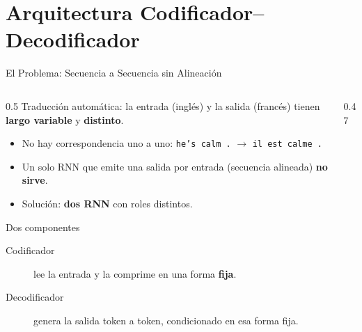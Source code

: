 \documentclass[aspectratio=169, 10pt]{beamer}
\begin{document}
\section{Arquitectura Codificador--Decodificador}

\begin{frame}{El Problema: Secuencia a Secuencia sin Alineaci\'on}

	\begin{columns}[T]
		\begin{column}{0.5\textwidth}
			\small
			Traducci\'on autom\'atica: la entrada (ingl\'es) y la salida (franc\'es) tienen \textbf{largo variable} y \textbf{distinto}.
			\begin{itemize}
				\item No hay correspondencia uno a uno: \texttt{he's calm .} $\to$ \texttt{il est calme .}
				\item Un solo RNN que emite una salida por entrada (secuencia alineada) \textbf{no sirve}.
				\item Soluci\'on: \textbf{dos RNN} con roles distintos.
			\end{itemize}

			\begin{block}{Dos componentes}
				\small
				\begin{description}
					\item[Codificador] lee la entrada y la comprime en una forma \textbf{fija}.
					\item[Decodificador] genera la salida token a token, condicionado en esa forma fija.
				\end{description}
			\end{block}
		\end{column}

		\begin{column}{0.47\textwidth}
			\centering
		\end{column}
	\end{columns}

\end{frame}
\end{document}
